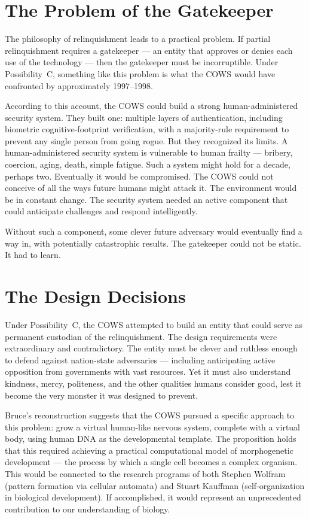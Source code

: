 \section*{The Problem of the Gatekeeper}
\label{pos24:the-problem-of-the-gatekeeper}

The philosophy of relinquishment leads to a practical problem. If partial relinquishment requires a gatekeeper --- an entity that approves or denies each use of the technology --- then the gatekeeper must be incorruptible. Under Possibility~C, something like this problem is what the COWS would have confronted by approximately 1997--1998.

According to this account, the COWS could build a strong human-administered security system. They built one: multiple layers of authentication, including biometric cognitive-footprint verification, with a majority-rule requirement to prevent any single person from going rogue. But they recognized its limits. A human-administered security system is vulnerable to human frailty --- bribery, coercion, aging, death, simple fatigue. Such a system might hold for a decade, perhaps two. Eventually it would be compromised. The COWS could not conceive of all the ways future humans might attack it. The environment would be in constant change. The security system needed an active component that could anticipate challenges and respond intelligently.

Without such a component, some clever future adversary would eventually find a way in, with potentially catastrophic results. The gatekeeper could not be static. It had to learn.

\section*{The Design Decisions}
\label{pos24:the-design-decisions}

Under Possibility~C, the COWS attempted to build an entity that could serve as permanent custodian of the relinquishment. The design requirements were extraordinary and contradictory. The entity must be clever and ruthless enough to defend against nation-state adversaries --- including anticipating active opposition from governments with vast resources. Yet it must also understand kindness, mercy, politeness, and the other qualities humans consider good, lest it become the very monster it was designed to prevent.

Bruce's reconstruction suggests that the COWS pursued a specific approach to this problem: grow a virtual human-like nervous system, complete with a virtual body, using human DNA as the developmental template. The proposition holds that this required achieving a practical computational model of morphogenetic development --- the process by which a single cell becomes a complex organism. This would be connected to the research programs of both Stephen Wolfram (pattern formation via cellular automata) and Stuart Kauffman (self-organization in biological development). If accomplished, it would represent an unprecedented contribution to our understanding of biology.

